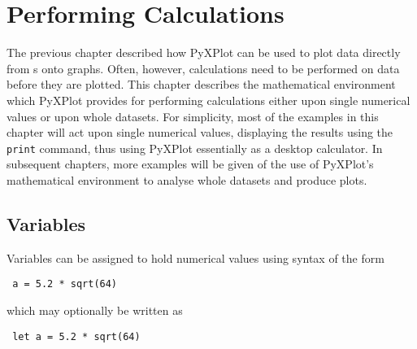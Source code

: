 %
%
%
%
%



\chapter{Performing Calculations}

The previous chapter described how PyXPlot can be used to plot data directly
from \datafile s onto graphs. Often, however, calculations need to be performed
on data before they are plotted. This chapter describes the mathematical
environment which PyXPlot provides for performing calculations either upon
single numerical values or upon whole datasets.  For simplicity, most of the
examples in this chapter will act upon single numerical values, displaying the
results using the {\tt print} command, thus using PyXPlot essentially as a
desktop calculator. In subsequent chapters, more examples will be given of the
use of PyXPlot's mathematical environment to analyse whole datasets and produce
plots.

\section{Variables}

Variables can be assigned to hold numerical values using syntax of the form

\begin{verbatim} a = 5.2 * sqrt(64) \end{verbatim}

\noindent which may optionally be written as

\begin{verbatim} let a = 5.2 * sqrt(64) \end{verbatim}

